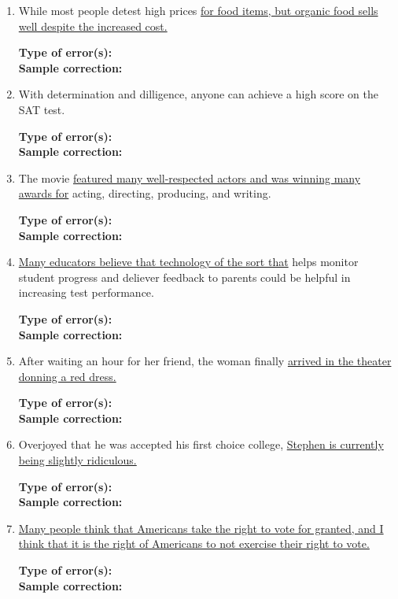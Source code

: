 \documentclass[12pt]{book}
\begin{document}
\begin{enumerate}
\begin{enumerate}
\bigskip
\item While most people detest high prices \ul{for food items, but organic food sells well despite the increased cost.}

\bigskip
\textbf{Type of error(s):} \hrulefill  \\
\textbf{Sample correction:} \hrulefill

\item With determination and dilligence, anyone can achieve a high score on the SAT test. 

\bigskip
\textbf{Type of error(s):} \hrulefill  \\
\textbf{Sample correction:} \hrulefill

\bigskip
\item The movie \ul{featured many well-respected actors and was winning many awards for} acting, directing, producing, and writing. 

\bigskip
\textbf{Type of error(s):} \hrulefill  \\
\textbf{Sample correction:} \hrulefill

\bigskip
\item \ul{Many educators believe that technology of the sort that} helps monitor student progress and deliever feedback to parents could be helpful in increasing test performance. 

\bigskip
\textbf{Type of error(s):} \hrulefill  \\
\textbf{Sample correction:} \hrulefill

\item After waiting an hour for her friend, the woman finally \ul{arrived in the theater donning a red dress.}

\bigskip
\textbf{Type of error(s):} \hrulefill  \\
\textbf{Sample correction:} \hrulefill

\item Overjoyed that he was accepted his first choice college, \ul{Stephen is currently being slightly ridiculous.}

\bigskip
\textbf{Type of error(s):} \hrulefill  \\
\textbf{Sample correction:} \hrulefill

\item \ul{Many people think that Americans take the right to vote for granted, and I think that it is the right of Americans to not exercise their right to vote.}

\bigskip
\textbf{Type of error(s):} \hrulefill  \\
\textbf{Sample correction:} \hrulefill


\end{enumerate}
\end{enumerate}
\end{document}
